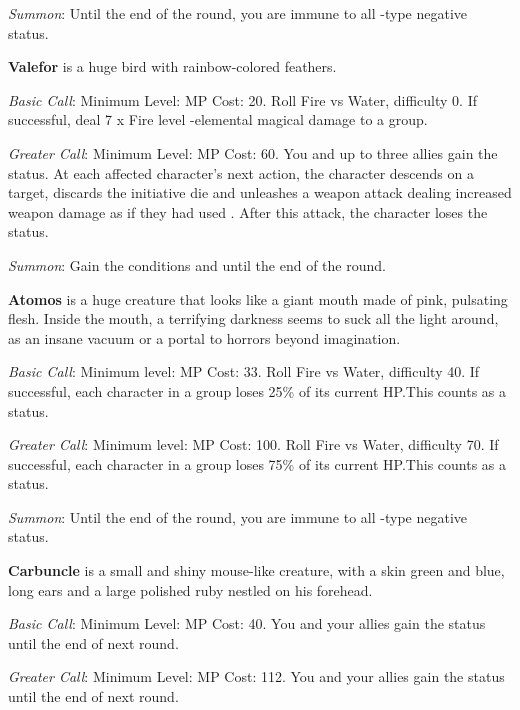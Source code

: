 \begin{multicols}{2}
    \textit{Summon}: Until the end of the round, you are immune to all -type negative status.
    
    \textbf{Valefor} is a huge bird with rainbow-colored feathers.
    
    \textit{Basic Call}: Minimum Level:  MP Cost: 20. Roll Fire vs Water, difficulty 0. If successful, deal 7 x Fire level -elemental magical damage to a group.
    
    \textit{Greater Call}: Minimum Level:  MP Cost: 60. You and up to three allies gain the  status. At each affected character’s next action, the character descends on a target, discards the initiative die and unleashes a weapon attack dealing increased weapon damage as if they had used . After this attack, the character loses the  status.
    
    \textit{Summon}: Gain the conditions  and   until the end of the round. 
    
    \textbf{Atomos} is a huge creature that looks like a giant mouth made of pink, pulsating flesh. Inside the mouth, a terrifying darkness seems to suck all the light around, as an insane vacuum or a portal to horrors beyond imagination.
    
    \textit{Basic Call}: Minimum level:  MP Cost: 33. Roll Fire vs Water, difficulty 40. If successful, each character in a group loses 25\% of its current HP.\@{}This counts as a  status.
    
    \textit{Greater Call}: Minimum level:  MP Cost: 100. Roll Fire vs Water, difficulty 70. If successful, each character in a group loses 75\% of its current HP.\@{}This counts as a  status.
    
    \textit{Summon}: Until the end of the round, you are immune to all -type negative status.
    
    \textbf{Carbuncle} is a small and shiny mouse-like creature, with a skin green and blue, long ears and a large polished ruby nestled on his forehead.
    
    \textit{Basic Call}: Minimum Level:  MP Cost: 40. You and your allies gain the  status until the end of next round.
    
    \textit{Greater Call}: Minimum Level:  MP Cost: 112. You and your allies gain the  status until the end of next round.
    

\end{multicols}
